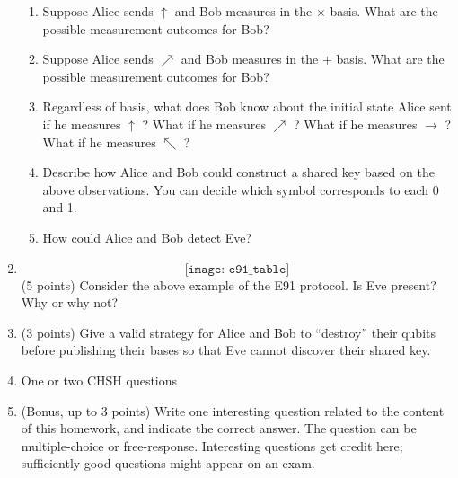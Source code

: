 \documentclass[12pt]{article}
\begin{document}
\begin{enumerate}[font=\bfseries]
\begin{enumerate}
            \item Suppose Alice sends $\uparrow$ and Bob measures in the $\times$ basis. What are the possible measurement outcomes for Bob?
            \item Suppose Alice sends $\nearrow$ and Bob measures in the $+$ basis. What are the possible measurement outcomes for Bob?
            \item Regardless of basis, what does Bob know about the initial state Alice sent if he measures $\uparrow$ ? What if he measures $\nearrow$ ? What if he measures  $\rightarrow$ ? What if he measures $\nwarrow$ ?
            \item Describe how Alice and Bob could construct a shared key based on the above observations. You can decide which symbol corresponds to each 0 and 1. 
            \item How could Alice and Bob detect Eve?
        \end{enumerate}
    \item \[\texttt{[image: e91\_table]}\]
    (5 points) Consider the above example of the E91 protocol. Is Eve present? Why or why not?
    \item (3 points) Give a valid strategy for Alice and Bob to ``destroy'' their qubits before publishing their bases so that Eve cannot discover their shared key. 
    \item One or two CHSH questions
    \item (Bonus, up to 3 points) Write one interesting question related to the content of this homework, and indicate the correct answer. The question can be multiple-choice or free-response.  Interesting questions get credit here;  sufficiently good questions might appear on an exam.
\end{enumerate}
\end{document}

